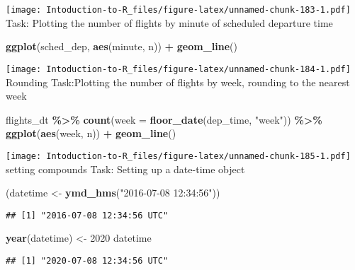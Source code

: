 \documentclass[
]{article}
\newenvironment{Shaded}{\begin{snugshade}}{\end{snugshade}}
\newcommand{\AttributeTok}[1]{\textcolor[rgb]{0.13,0.29,0.53}{#1}}
\newcommand{\DecValTok}[1]{\textcolor[rgb]{0.00,0.00,0.81}{#1}}
\newcommand{\FunctionTok}[1]{\textcolor[rgb]{0.13,0.29,0.53}{\textbf{#1}}}
\newcommand{\NormalTok}[1]{#1}
\newcommand{\OtherTok}[1]{\textcolor[rgb]{0.56,0.35,0.01}{#1}}
\newcommand{\SpecialCharTok}[1]{\textcolor[rgb]{0.81,0.36,0.00}{\textbf{#1}}}
\newcommand{\StringTok}[1]{\textcolor[rgb]{0.31,0.60,0.02}{#1}}
\begin{document}
\texttt{[image: Intoduction-to-R\_files/figure-latex/unnamed-chunk-183-1.pdf]}
Task: Plotting the number of flights by minute of scheduled departure
time

\begin{Shaded}
\begin{Highlighting}[]
\FunctionTok{ggplot}\NormalTok{(sched\_dep, }\FunctionTok{aes}\NormalTok{(minute, n)) }\SpecialCharTok{+}
  \FunctionTok{geom\_line}\NormalTok{()}
\end{Highlighting}
\end{Shaded}

\texttt{[image: Intoduction-to-R\_files/figure-latex/unnamed-chunk-184-1.pdf]}
Rounding Task:Plotting the number of flights by week, rounding to the
nearest week

\begin{Shaded}
\begin{Highlighting}[]
\NormalTok{flights\_dt }\SpecialCharTok{\%\textgreater{}\%} 
  \FunctionTok{count}\NormalTok{(}\AttributeTok{week =} \FunctionTok{floor\_date}\NormalTok{(dep\_time, }\StringTok{"week"}\NormalTok{)) }\SpecialCharTok{\%\textgreater{}\%} 
  \FunctionTok{ggplot}\NormalTok{(}\FunctionTok{aes}\NormalTok{(week, n)) }\SpecialCharTok{+}
    \FunctionTok{geom\_line}\NormalTok{()}
\end{Highlighting}
\end{Shaded}

\texttt{[image: Intoduction-to-R\_files/figure-latex/unnamed-chunk-185-1.pdf]}
setting compounds Task: Setting up a date-time object

\begin{Shaded}
\begin{Highlighting}[]
\NormalTok{(datetime }\OtherTok{\textless{}{-}} \FunctionTok{ymd\_hms}\NormalTok{(}\StringTok{"2016{-}07{-}08 12:34:56"}\NormalTok{))}
\end{Highlighting}
\end{Shaded}

\begin{verbatim}
## [1] "2016-07-08 12:34:56 UTC"
\end{verbatim}

\begin{Shaded}
\begin{Highlighting}[]
\FunctionTok{year}\NormalTok{(datetime) }\OtherTok{\textless{}{-}} \DecValTok{2020}
\NormalTok{datetime}
\end{Highlighting}
\end{Shaded}

\begin{verbatim}
## [1] "2020-07-08 12:34:56 UTC"
\end{verbatim}
\end{document}
